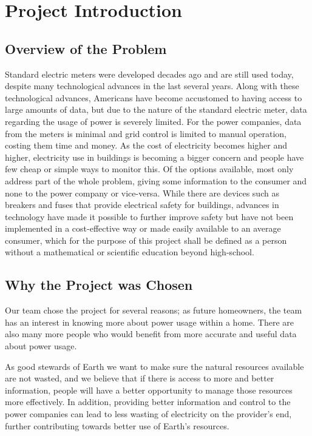 \section{Project Introduction}
\subsection{Overview of the Problem}
Standard electric meters were developed decades ago and are still used today, despite many technological advances in the last several years. Along with these technological advances, Americans have become accustomed to having access to large amounts of data, but due to the nature of the standard electric meter, data regarding the usage of power is severely limited. For the power companies, data from the meters is minimal and grid control is limited to manual operation, costing them time and money.
As the cost of electricity becomes higher and higher, electricity use in buildings is becoming a bigger concern and people have few cheap or simple ways to monitor this. Of the options available, most only address part of the whole problem, giving some information to the consumer and none to the power company or vice-versa. While there are devices such as breakers and fuses that provide electrical safety for buildings, advances in technology have made it possible to further improve safety but have not been implemented in a cost-effective way or made easily available to an average consumer, which for the purpose of this project shall be defined as a person without a mathematical or scientific education beyond high-school.

\subsection{Why the Project was Chosen}
Our team chose the project for several reasons; as future homeowners, the team has an interest in knowing more about power usage within a home. There are also many more people who would benefit from more accurate and useful data about power usage.

As good stewards of Earth we want to make sure the natural resources available are not wasted, and we believe that if there is access to more and better information, people will have a better opportunity to manage those resources more effectively. In addition, providing better information and control to the power companies can lead to less wasting of electricity on the provider's end, further contributing towards better use of Earth's resources.

